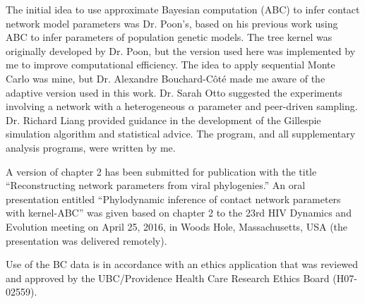 The initial idea to use approximate Bayesian computation (ABC) to infer contact
network model parameters was Dr. Poon's, based on his previous work using ABC
to infer parameters of population genetic models. The tree kernel was
originally developed by Dr. Poon, but the version used here was implemented by
me to improve computational efficiency. The idea to apply sequential Monte
Carlo was mine, but Dr. Alexandre Bouchard-C\^ot\'e made me aware of the
adaptive version used in this work. Dr. Sarah Otto suggested the experiments
involving a network with a heterogeneous $\alpha$ parameter and peer-driven
sampling. Dr. Richard Liang provided guidance in the development of the
Gillespie simulation algorithm and statistical advice. The 
program, and all supplementary analysis programs, were written by me.

A version of chapter 2 has been submitted for publication with the title
``Reconstructing network parameters from viral phylogenies.'' An oral
presentation entitled ``Phylodynamic inference of contact network parameters
with kernel-ABC'' was given based on chapter 2 to the 23rd HIV Dynamics and
Evolution meeting on April 25, 2016, in Woods Hole, Massachusetts, USA (the
presentation was delivered remotely). 

Use of the BC data is in accordance with an ethics application that was
reviewed and approved by the UBC/Providence Health Care Research Ethics Board
(H07-02559).
